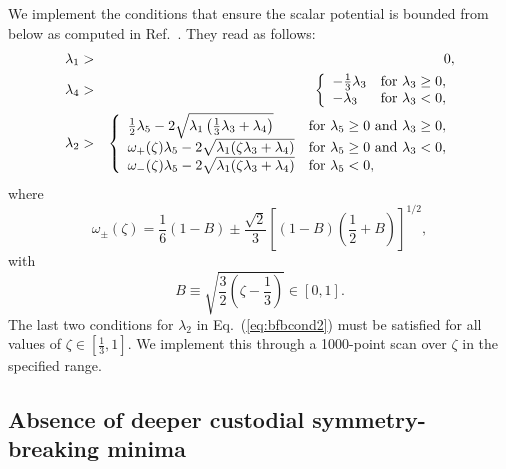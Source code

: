 \documentclass[11pt]{article}
\begin{document}
We implement the conditions that ensure the scalar potential is bounded from below as computed in Ref.~\cite{HKL}.  They read as follows:
\begin{eqnarray}
	\lambda_1 &>& 0, \nonumber \\
	\lambda_4 &>& \left\{ \begin{array}{l l}
		- \frac{1}{3} \lambda_3 & {\rm for} \ \lambda_3 \geq 0, \\
		- \lambda_3 & {\rm for} \ \lambda_3 < 0, \end{array} \right. \nonumber \\
	\lambda_2 &>& \left\{ \begin{array}{l l}
		\frac{1}{2} \lambda_5 - 2 \sqrt{\lambda_1 \left( \frac{1}{3} \lambda_3 + \lambda_4 \right)} &
			{\rm for} \ \lambda_5 \geq 0 \ {\rm and} \ \lambda_3 \geq 0, \\
		\omega_+(\zeta) \lambda_5 - 2 \sqrt{\lambda_1 ( \zeta \lambda_3 + \lambda_4)} &
			{\rm for} \ \lambda_5 \geq 0 \ {\rm and} \ \lambda_3 < 0, \\
		\omega_-(\zeta) \lambda_5 - 2 \sqrt{\lambda_1 (\zeta \lambda_3 + \lambda_4)} &
			{\rm for} \ \lambda_5 < 0, 
			\end{array} \right.
	\label{eq:bfbcond2}
\end{eqnarray}
where 
\begin{equation}
	\omega_{\pm}(\zeta) = \frac{1}{6}(1 - B) \pm \frac{\sqrt{2}}{3} \left[ (1 - B) \left(\frac{1}{2} + B\right)\right]^{1/2},
\end{equation}
with
\begin{equation}
	B \equiv \sqrt{\frac{3}{2}\left(\zeta - \frac{1}{3}\right)} \in [0,1].
\end{equation}
The last two conditions for $\lambda_2$ in Eq.~(\ref{eq:bfbcond2}) must be satisfied for all values of $\zeta \in \left[ \frac{1}{3}, 1 \right]$.  We implement this through a 1000-point scan over $\zeta$ in the specified range.

\subsection{Absence of deeper custodial symmetry-breaking minima}
\end{document}
